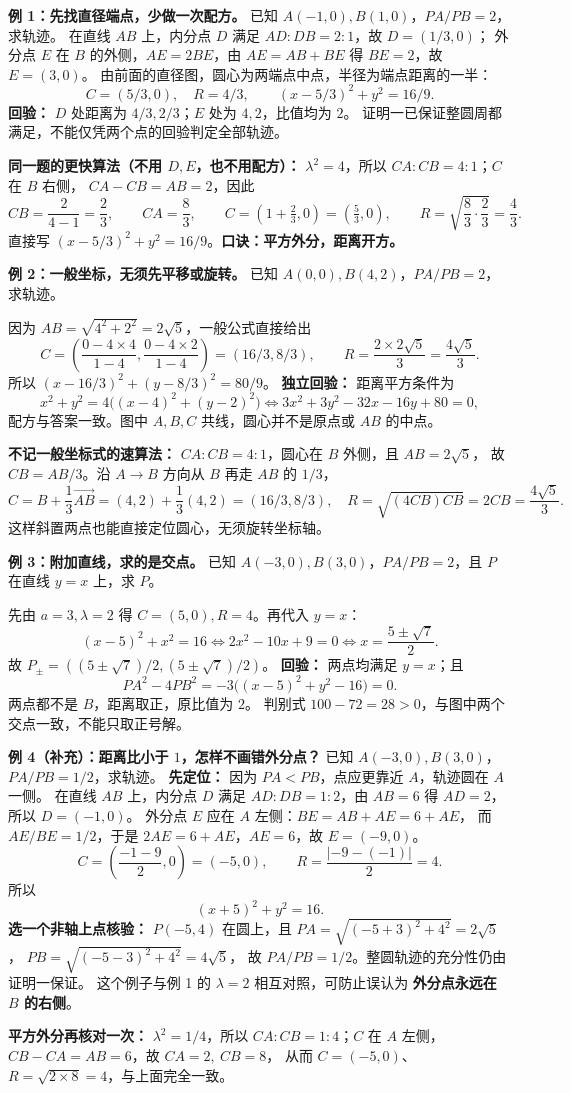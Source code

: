 \clearpage
\begin{examplebox}
\textbf{例 1：先找直径端点，少做一次配方。}
已知 $A(-1,0),B(1,0)$，$PA/PB=2$，求轨迹。
在直线 $AB$ 上，内分点 $D$ 满足 $AD:DB=2:1$，故 $D=(1/3,0)$；
外分点 $E$ 在 $B$ 的外侧，$AE=2BE$，由 $AE=AB+BE$ 得 $BE=2$，故 $E=(3,0)$。
由前面的直径图，圆心为两端点中点，半径为端点距离的一半：
\[
 C=(5/3,0),\quad R=4/3,\qquad
 \boxed{(x-5/3)^2+y^2=16/9}.
\]
\textbf{回验：} $D$ 处距离为 $4/3,2/3$；$E$ 处为 $4,2$，比值均为 $2$。
证明一已保证整圆周都满足，不能仅凭两个点的回验判定全部轨迹。

\textbf{同一题的更快算法（不用 $D,E$，也不用配方）：}
$\lambda^2=4$，所以 $CA:CB=4:1$；$C$ 在 $B$ 右侧，
$CA-CB=AB=2$，因此
\[
 CB=\frac{2}{4-1}=\frac23,\qquad CA=\frac83,\qquad
 C=(1+\tfrac23,0)=(\tfrac53,0),\qquad R=\sqrt{\frac83\cdot\frac23}=\frac43.
\]
直接写 $(x-5/3)^2+y^2=16/9$。\textbf{口诀：平方外分，距离开方。}

\tcbbreak
\textbf{例 2：一般坐标，无须先平移或旋转。}
已知 $A(0,0),B(4,2)$，$PA/PB=2$，求轨迹。

因为 $AB=\sqrt{4^2+2^2}=2\sqrt5$，一般公式直接给出
\[
 C=\left(\frac{0-4\times4}{1-4},\frac{0-4\times2}{1-4}\right)
   =(16/3,8/3),\qquad
 R=\frac{2\times2\sqrt5}{3}=\frac{4\sqrt5}{3}.
\]
所以 $\boxed{(x-16/3)^2+(y-8/3)^2=80/9}$。
\textbf{独立回验：} 距离平方条件为
\[
 x^2+y^2=4\bigl((x-4)^2+(y-2)^2\bigr)
 \Longleftrightarrow 3x^2+3y^2-32x-16y+80=0,
\]
配方与答案一致。图中 $A,B,C$ 共线，圆心并不是原点或 $AB$ 的中点。

\textbf{不记一般坐标式的速算法：}
$CA:CB=4:1$，圆心在 $B$ 外侧，且 $AB=2\sqrt5$，
故 $CB=AB/3$。沿 $A\to B$ 方向从 $B$ 再走 $AB$ 的 $1/3$，
\[
 C=B+\frac13\overrightarrow{AB}
   =(4,2)+\frac13(4,2)=(16/3,8/3),\quad
 R=\sqrt{(4CB)CB}=2CB=\frac{4\sqrt5}{3}.
\]
这样斜置两点也能直接定位圆心，无须旋转坐标轴。

\tcbbreak
\textbf{例 3：附加直线，求的是交点。}
已知 $A(-3,0),B(3,0)$，$PA/PB=2$，且 $P$ 在直线 $y=x$ 上，求 $P$。

先由 $a=3,\lambda=2$ 得 $C=(5,0),R=4$。再代入 $y=x$：
\[
 (x-5)^2+x^2=16
 \Longleftrightarrow 2x^2-10x+9=0
 \Longleftrightarrow x=\frac{5\pm\sqrt7}{2}.
\]
故 $\boxed{P_\pm=((5\pm\sqrt7)/2,(5\pm\sqrt7)/2)}$。
\textbf{回验：} 两点均满足 $y=x$；且
\[
 PA^2-4PB^2=-3\bigl((x-5)^2+y^2-16\bigr)=0.
\]
两点都不是 $B$，距离取正，原比值为 $2$。
判别式 $100-72=28>0$，与图中两个交点一致，不能只取正号解。


\tcbbreak
\textbf{例 4（补充）：距离比小于 $1$，怎样不画错外分点？}
已知 $A(-3,0),B(3,0)$，$PA/PB=1/2$，求轨迹。
\textbf{先定位：} 因为 $PA<PB$，点应更靠近 $A$，轨迹圆在 $A$ 一侧。
在直线 $AB$ 上，内分点 $D$ 满足 $AD:DB=1:2$，由 $AB=6$ 得
$AD=2$，所以 $D=(-1,0)$。
外分点 $E$ 应在 $A$ 左侧：$BE=AB+AE=6+AE$，
而 $AE/BE=1/2$，于是 $2AE=6+AE$，$AE=6$，故 $E=(-9,0)$。
\[
 C=\left(\frac{-1-9}{2},0\right)=(-5,0),\qquad
 R=\frac{|{-9}-({-1})|}{2}=4.
\]
所以
\[
 \boxed{(x+5)^2+y^2=16}.
\]
\textbf{选一个非轴上点核验：} $P(-5,4)$ 在圆上，且
$PA=\sqrt{(-5+3)^2+4^2}=2\sqrt5$，
$PB=\sqrt{(-5-3)^2+4^2}=4\sqrt5$，
故 $PA/PB=1/2$。整圆轨迹的充分性仍由证明一保证。
这个例子与例 1 的 $\lambda=2$ 相互对照，可防止误认为
\textbf{外分点永远在 $B$ 的右侧}。

\textbf{平方外分再核对一次：}
$\lambda^2=1/4$，所以 $CA:CB=1:4$；$C$ 在 $A$ 左侧，
$CB-CA=AB=6$，故 $CA=2,\ CB=8$，
从而 $C=(-5,0)$、$R=\sqrt{2\times8}=4$，与上面完全一致。
\end{examplebox}
